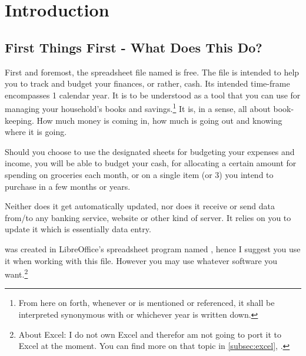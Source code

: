\section{Introduction}
\label{sec:introduction}

\subsection{First Things First - What Does This Do?}
\label{subsec:first-things-first}

First and foremost, the spreadsheet file named  is free.
The file is intended to help you to track and budget your finances, or rather, cash.
Its intended time-frame encompasses 1 calendar year.
It is to be understood as a tool that you can use for managing your household's books and savings.\footnote{From here on forth, whenever  or \begriff{\tfn} is mentioned or referenced, it shall be interpreted synonymous with  or whichever year is written down.}
It is, in a sense, all about book-keeping.
How much money is coming in, how much is going out and knowing where it is going.


\begin{comment}
\begin{figure}[htp]
	\centering
	\caption[3r49twsef]{3r49twsef.
	d0f8934zsd.}
\end{figure}
\end{comment}

Should you choose to use the designated sheets for budgeting your expenses and income, you will be able to budget your cash, \eg for allocating a certain amount for spending on groceries each month, or on a single item (or 3) you intend to purchase in a few months or years.


Neither does it get automatically updated, nor does it receive or send data from/to any banking service, website or other kind of server.
It relies on you to update it which is essentially data entry.

\tfn was created in LibreOffice's spreadsheet program named , hence I suggest you use it when working with this file.
However you may use whatever software you want.\footnote{About Excel: I do not own Excel and therefor am not going to port it to Excel at the moment.
You can find more on that topic in \autoref{subsec:excel}, .}


